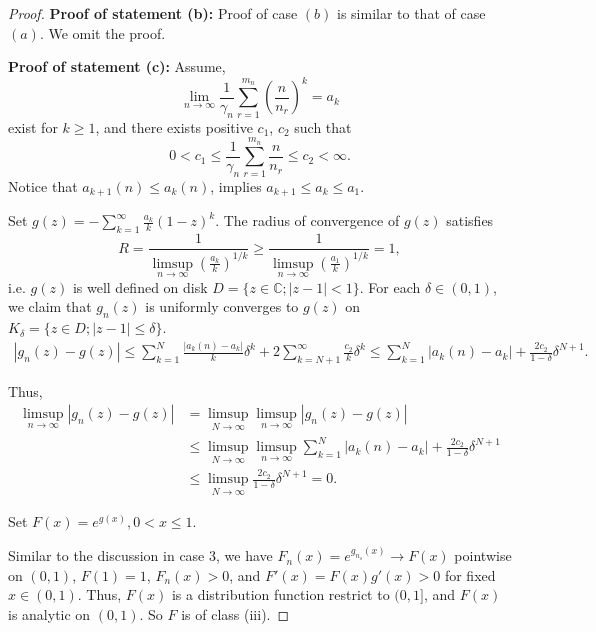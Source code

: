 \documentclass[12pt]{article}
\theoremstyle{plain}
\theoremstyle{definition}
\theoremstyle{remark}
\begin{document}
\begin{proof}
\textbf{Proof of statement (b):}
Proof of case $(b)$ is similar to that of case $(a)$. We omit the proof. 

\textbf{Proof of statement (c):}
Assume, 
\begin{equation}
     \lim_{n\rightarrow\infty}\frac{1}{\gamma_{n}} \sum_{r=1}^{m_n} \left(\frac{n}{n_{r}}\right)^k=a_k
    \end{equation}
    exist for $k\geq 1$, and there exists positive $c_1$, $c_2$ such that
    \begin{equation}
    0< c_1\leq\frac{1}{\gamma_{n}} \sum_{r=1}^{m_n} \frac{n}{n_{r}}\leq c_2<\infty. \end{equation}
Notice that $a_{k+1}{(n)}\leq a_k{(n)}$, implies $a_{k+1}\leq a_k\leq a_1$.

Set $g(z)=-\sum_{k=1}^\infty \frac{a_k}{k}(1-z)^k$. The radius of convergence of $g(z)$ satisfies 
$$
R=\frac{1}{\limsup_{n\rightarrow \infty} \left( \frac{a_k}{k}\right)^{1/k} }\geq\frac{1}{\limsup_{n\rightarrow \infty} \left( \frac{a_1}{k}\right)^{1/k} } =1,
$$
i.e. $g(z)$ is well defined on disk $D=\{z\in\mathbb{C};|z-1|<1\}$. 
For each $\delta\in(0,1)$, we claim that $g_n(z)$ is uniformly converges to $g(z)$ on $K_\delta=\{z\in D;|z-1|\leq\delta\}$.
\begin{align*}
    |g_n(z)-g(z)|\leq \sum_{k=1}^N\frac{|a_k{(n)}-a_k|}{k}\delta^k+2\sum_{k=N+1}^\infty \frac{c_2}{k}\delta^k \leq \sum_{k=1}^N|a_k{(n)}-a_k|+\frac{2c_2}{1-\delta}\delta^{N+1}.
\end{align*}

Thus,
\begin{align*}
\limsup_{n\rightarrow \infty}|g_n(z)-g(z)|&=\limsup_{N\rightarrow \infty}\limsup_{n\rightarrow \infty}|g_n(z)-g(z)|\\
&\leq \limsup_{N\rightarrow \infty}\limsup_{n\rightarrow \infty}
\sum_{k=1}^N|a_k{(n)}-a_k|+\frac{2c_2}{1-\delta}\delta^{N+1}\\
&\leq   \limsup_{N\rightarrow \infty}\frac{2c_2}{1-\delta}\delta^{N+1}=0.
\end{align*}
 
Set $F(x)=e^{g(x)},0<x\leq 1$. 

Similar to the discussion in case 3, we have
$F_n(x)=e^{g_{n_s}(x)}\rightarrow F(x)$ pointwise on $(0,1)$, $F(1)=1$, $ F_n(x)>0$, and $F'(x)=F(x)g'(x)>0$ for fixed $x\in(0,1)$. Thus, $F(x)$ is a distribution function restrict to $(0,1]$, and $F(x)$ is analytic on $(0,1)$. So $F$ is of class (iii).


\end{proof}
\end{document}
